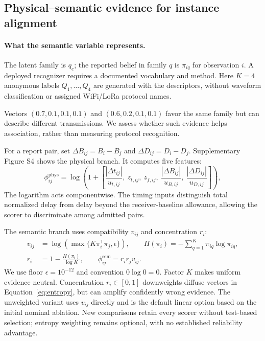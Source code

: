 \subsection{Physical--semantic evidence for instance alignment}
\paragraph{What the semantic variable represents.}
The latent family is $q_e$; the reported belief in family $q$ is $\pi_{iq}$ for observation $i$. A deployed recognizer requires a documented vocabulary and method. Here $K=4$ anonymous labels $Q_1,\ldots,Q_4$ are generated with the descriptors, without waveform classification or assigned WiFi/LoRa protocol names.

Vectors $(0.7,0.1,0.1,0.1)$ and $(0.6,0.2,0.1,0.1)$ favor the same family but can describe different transmissions. We assess whether such evidence helps association, rather than measuring protocol recognition.

For a report pair, set $\Delta B_{ij}=B_i-B_j$ and $\Delta D_{ij}=D_i-D_j$. Supplementary Figure S4 shows the physical branch. It computes five features:
\begin{equation}
 \phi^{\mathrm{phys}}_{ij}=\log\!\left(1+
 \left[\frac{|\Delta t_{ij}|}{u_{t,ij}},\ z_{t,ij},\ z_{f,ij},\
 \frac{|\Delta B_{ij}|}{u_{B,ij}},\ \frac{|\Delta D_{ij}|}{u_{D,ij}}\right]\right),\label{eq:physical}
\end{equation}
The logarithm acts componentwise. The timing inputs distinguish total normalized delay from delay beyond the receiver-baseline allowance, allowing the scorer to discriminate among admitted pairs.

The semantic branch uses compatibility $v_{ij}$ and concentration $r_i$:
\begin{align}
 v_{ij}&=\log\!\left(\max\{K\pi_i^{\mathsf T}\pi_j,\epsilon\}\right),\qquad
 H(\pi_i)=-\sum_{q=1}^{K}\pi_{iq}\log\pi_{iq},\label{eq:sem}\\
 r_i&=1-\frac{H(\pi_i)}{\log K},\qquad
 \phi^{\mathrm{sem}}_{ij}=r_i r_j v_{ij}.\label{eq:entropy}
\end{align}
We use floor $\epsilon=10^{-12}$ and convention $0\log0=0$. Factor $K$ makes uniform evidence neutral. Concentration $r_i\in[0,1]$ downweights diffuse vectors in Equation~\eqref{eq:entropy}, but can amplify confidently wrong evidence. The unweighted variant uses $v_{ij}$ directly and is the default linear option based on the initial nominal ablation. New comparisons retain every scorer without test-based selection; entropy weighting remains optional, with no established reliability advantage.


